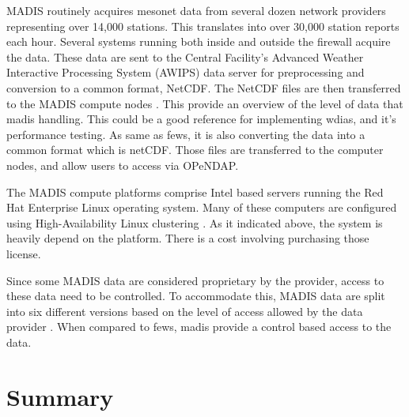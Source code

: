 MADIS routinely acquires mesonet data from several dozen network providers representing over 14,000 stations. This translates into over 30,000 station reports each hour. Several systems running both inside and outside the firewall acquire the data. These data are sent to the Central Facility's Advanced Weather Interactive Processing System (AWIPS) data server for preprocessing and conversion to a common format, NetCDF. The NetCDF files are then transferred to the MADIS compute nodes \cite{Macdermaid2005ARCHITECTUREP2.39}. This provide an overview of the level of data that \acrshort{madis} handling. This could be a good reference for implementing \acrshort{wdias}, and it's performance testing. As same as \acrshort{fews}, it is also converting the data into a common format which is \acrshort{netCDF}. Those files are transferred to the computer nodes, and allow users to access via OPeNDAP.

The MADIS compute platforms comprise Intel based servers running the Red Hat Enterprise Linux operating system. Many of these computers are configured using High-Availability Linux clustering \cite{Macdermaid2005ARCHITECTUREP2.39}. As it indicated above, the system is heavily depend on the platform. There is a cost involving purchasing those license.

Since some MADIS data are considered proprietary by the provider, access to these data need to be controlled. To accommodate this, MADIS data are split into six different versions based on the level of access allowed by the data provider \cite{Macdermaid2005ARCHITECTUREP2.39}. When compared to \acrshort{fews}, \acrshort{madis} provide a control based access to the data.

\section{Summary}
\label{se:lit_summary}
